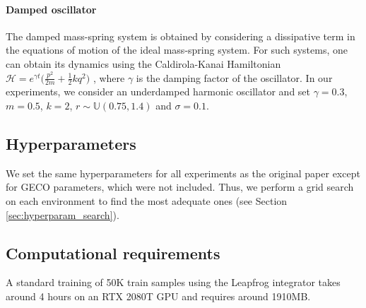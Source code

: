 \paragraph{Damped oscillator} The damped mass-spring system is obtained by considering a dissipative term in the equations of motion of the ideal mass-spring system. For such systems, one can obtain its dynamics using the Caldirola-Kanai Hamiltonian $\mathcal{H} = e^{\gamma t}\Big(\frac{p^2}{2m} + \frac{1}{2}kq^2 \Big)$ \cite{segovia2018one}, where $\gamma$ is the damping factor of the oscillator. In our experiments, we consider an underdamped harmonic oscillator and set $\gamma=0.3$, $m=0.5$, $k=2$, $r\sim\mathbb{U}(0.75, 1.4)$ and $\sigma=0.1$.


\subsection{Hyperparameters}
We set the same hyperparameters for all experiments as the original paper \cite{hgn} except for GECO parameters, which were not included.
Thus, we perform a grid search on each environment to find the most adequate ones (see Section \ref{sec:hyperparam_search}).


\subsection{Computational requirements}
A standard training of 50K train samples using the Leapfrog integrator takes around 4 hours on an RTX 2080T GPU and requires around 1910MB.